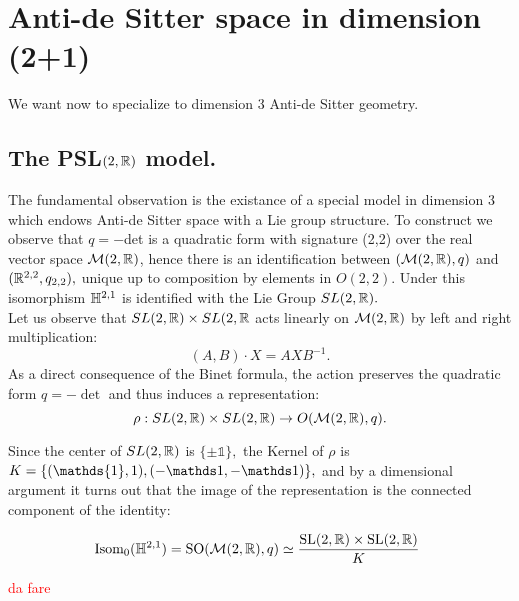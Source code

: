\chapter{Anti-de Sitter space in dimension (2+1)}
We want now to specialize to dimension 3 Anti-de Sitter geometry. 
\section{The {PSL}$(2,\mathbb{R})$ model.} The fundamental observation is the existance of a special model in dimension 3 which endows Anti-de Sitter space with a Lie group structure. To construct we observe that $q=-$det is a quadratic form with signature (2,2) over the real vector space $\mathcal{M}(2,\mathbb{R})$, hence there is an identification between $(\mathcal{M}(2,\mathbb{R}),q)$ and $(\mathbb{R}^{2,2}, q_{2,2}),$ unique up to composition by elements in $O(2,2)$. Under this isomorphism $\mathbb{H}^{2,1}$ is identified with the Lie Group $SL(2,\mathbb{R}).$\\
Let us observe that $SL(2,\mathbb{R})\times SL(2,\mathbb{R}$ acts linearly on $\mathcal{M}(2,\mathbb{R})$ by left and right multiplication:
\[
    (A,B)\cdot X=AXB^{-1}.
\]
As a direct consequence of the Binet formula, the action preserves the quadratic form $q=-\det$ and thus induces a representation: 
\[ 
    \rho:SL(2,\mathbb{R})\times SL(2,\mathbb{R})\to O(\mathcal{M}(2,\mathbb{R}),q).    
\]

Since the center of $SL(2,\mathbb{R})$ is $\{\pm \mathds{1}\},$ the Kernel of $\rho$ is $K=\{(\mathds{1},1),(-\1,-\1)\},$ and by a dimensional argument it turns out that the image of the representation is the connected component of the identity:

\[
    \text{Isom}_0(\mathbb{H}^{2,1})=\text{SO}(\mathcal{M}(2,\mathbb{R}),q)\simeq \frac{\text{SL}(2,\mathbb{R})\times \text{SL}(2,\mathbb{R})}{K}\
\]

\textcolor{red}{da fare}